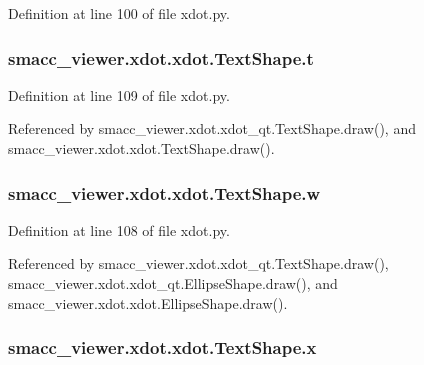 Definition at line 100 of file xdot.\+py.

\subsubsection[{\texorpdfstring{t}{t}}]{\setlength{\rightskip}{0pt plus 5cm}smacc\+\_\+viewer.\+xdot.\+xdot.\+Text\+Shape.\+t}\hypertarget{classsmacc__viewer_1_1xdot_1_1xdot_1_1TextShape_a4cf31f74ca22cecf522c155199204abb}{}\label{classsmacc__viewer_1_1xdot_1_1xdot_1_1TextShape_a4cf31f74ca22cecf522c155199204abb}


Definition at line 109 of file xdot.\+py.



Referenced by smacc\+\_\+viewer.\+xdot.\+xdot\+\_\+qt.\+Text\+Shape.\+draw(), and smacc\+\_\+viewer.\+xdot.\+xdot.\+Text\+Shape.\+draw().

\subsubsection[{\texorpdfstring{w}{w}}]{\setlength{\rightskip}{0pt plus 5cm}smacc\+\_\+viewer.\+xdot.\+xdot.\+Text\+Shape.\+w}\hypertarget{classsmacc__viewer_1_1xdot_1_1xdot_1_1TextShape_a7d5700693374eef8389975e2f1f8f849}{}\label{classsmacc__viewer_1_1xdot_1_1xdot_1_1TextShape_a7d5700693374eef8389975e2f1f8f849}


Definition at line 108 of file xdot.\+py.



Referenced by smacc\+\_\+viewer.\+xdot.\+xdot\+\_\+qt.\+Text\+Shape.\+draw(), smacc\+\_\+viewer.\+xdot.\+xdot\+\_\+qt.\+Ellipse\+Shape.\+draw(), and smacc\+\_\+viewer.\+xdot.\+xdot.\+Ellipse\+Shape.\+draw().

\subsubsection[{\texorpdfstring{x}{x}}]{\setlength{\rightskip}{0pt plus 5cm}smacc\+\_\+viewer.\+xdot.\+xdot.\+Text\+Shape.\+x}\hypertarget{classsmacc__viewer_1_1xdot_1_1xdot_1_1TextShape_adb71cfa0675b497482fbcfcf02149ce0}{}\label{classsmacc__viewer_1_1xdot_1_1xdot_1_1TextShape_adb71cfa0675b497482fbcfcf02149ce0}


